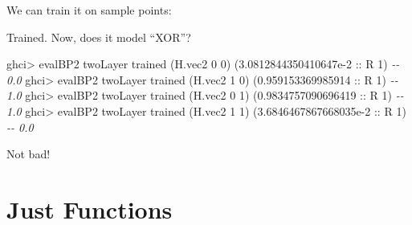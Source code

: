 \documentclass[]{article}
\newenvironment{Shaded}{}{}
\newcommand{\CommentTok}[1]{\textcolor[rgb]{0.38,0.63,0.69}{\textit{#1}}}
\newcommand{\DataTypeTok}[1]{\textcolor[rgb]{0.56,0.13,0.00}{#1}}
\newcommand{\DecValTok}[1]{\textcolor[rgb]{0.25,0.63,0.44}{#1}}
\newcommand{\FloatTok}[1]{\textcolor[rgb]{0.25,0.63,0.44}{#1}}
\newcommand{\FunctionTok}[1]{\textcolor[rgb]{0.02,0.16,0.49}{#1}}
\newcommand{\KeywordTok}[1]{\textcolor[rgb]{0.00,0.44,0.13}{\textbf{#1}}}
\newcommand{\NormalTok}[1]{#1}
\newcommand{\OperatorTok}[1]{\textcolor[rgb]{0.40,0.40,0.40}{#1}}
\newcommand{\OtherTok}[1]{\textcolor[rgb]{0.00,0.44,0.13}{#1}}
\begin{document}
We can train it on sample points:

\begin{Shaded}
\end{Shaded}

Trained. Now, does it model ``XOR''?

\begin{Shaded}
\begin{Highlighting}[]
\NormalTok{ghci}\OperatorTok{\textgreater{}}\NormalTok{ evalBP2 twoLayer trained (H.vec2 }\DecValTok{0} \DecValTok{0}\NormalTok{)}
\NormalTok{(}\FloatTok{3.0812844350410647e{-}2}\OtherTok{ ::} \DataTypeTok{R} \DecValTok{1}\NormalTok{)          }\CommentTok{{-}{-} 0.0}
\NormalTok{ghci}\OperatorTok{\textgreater{}}\NormalTok{ evalBP2 twoLayer trained (H.vec2 }\DecValTok{1} \DecValTok{0}\NormalTok{)}
\NormalTok{(}\FloatTok{0.959153369985914}\OtherTok{ ::} \DataTypeTok{R} \DecValTok{1}\NormalTok{)              }\CommentTok{{-}{-} 1.0}
\NormalTok{ghci}\OperatorTok{\textgreater{}}\NormalTok{ evalBP2 twoLayer trained (H.vec2 }\DecValTok{0} \DecValTok{1}\NormalTok{)}
\NormalTok{(}\FloatTok{0.9834757090696419}\OtherTok{ ::} \DataTypeTok{R} \DecValTok{1}\NormalTok{)             }\CommentTok{{-}{-} 1.0}
\NormalTok{ghci}\OperatorTok{\textgreater{}}\NormalTok{ evalBP2 twoLayer trained (H.vec2 }\DecValTok{1} \DecValTok{1}\NormalTok{)}
\NormalTok{(}\FloatTok{3.6846467867668035e{-}2}\OtherTok{ ::} \DataTypeTok{R} \DecValTok{1}\NormalTok{)          }\CommentTok{{-}{-} 0.0}
\end{Highlighting}
\end{Shaded}

Not bad!

\section{Just Functions}\label{just-functions}
\end{document}
